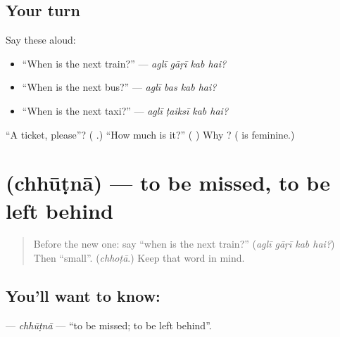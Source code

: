 \subsection*{Your turn}
Say these aloud:

\begin{itemize}
\raggedright
  \item \textquotedblleft{}When is the next train?\textquotedblright{} — \emph{aglī gāṛī kab hai?}
  \item \textquotedblleft{}When is the next bus?\textquotedblright{} — \emph{aglī bas kab hai?}
  \item \textquotedblleft{}When is the next taxi?\textquotedblright{} — \emph{aglī ṭaiksī kab hai?}
\end{itemize}

\begin{tcolorbox}[breakable,colback=teal!4,colframe=teal!35!black,title={Before you move on}]
\textquotedblleft{}A ticket, please\textquotedblright{}? (\textbf{  }.) \textquotedblleft{}How much is it?\textquotedblright{} (\textbf{  }) Why \textbf{}? (\textbf{} is feminine.)
\end{tcolorbox}
\section[\texorpdfstring{\ur{چھوٹنا} (chhūṭnā)}{چھوٹنا (chhūṭnā)}]{ (chhūṭnā) — to be missed, to be left behind}

\label{lesson:UR-C271-chhutna}



\begin{quote}
Before the new one: say \textquotedblleft{}when is the next train?\textquotedblright{} (\emph{aglī gāṛī kab hai?}) Then \textquotedblleft{}small\textquotedblright{}. (\emph{chhoṭā}.) Keep that word in mind.
\end{quote}

\subsection*{You'll want to know: }
\textbf{} — \emph{chhūṭnā} — \textquotedblleft{}to be missed; to be left behind\textquotedblright{}.

\begin{quote}
\textbf{   }
\end{quote}

